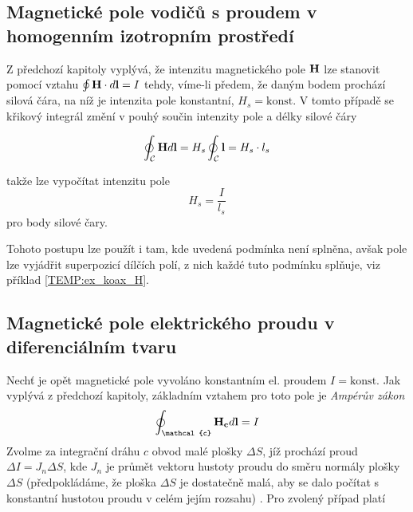     \subsection{Magnetické pole vodičů s proudem v homogen\-ním izo\-trop\-ním prostředí}
      Z předchozí kapitoly vyplývá, že intenzitu magnetického pole $\mathbf{H}$ lze stanovit pomocí
      vztahu $\oint\mathbf{H}\cdot d\mathbf{l} = I$ tehdy, víme-li předem, že daným bodem prochází silová
      čára, na níž je intenzita pole konstantní, $H_s = \text{konst}$. V tomto případě se křikový
      integrál změní v pouhý součin intenzity pole a délky silové čáry
       
       \begin{equation}\label{TEMP:eq_1MR_v_hom_p}
         \oint_\mathcal{C}\mathbf{H}d\mathbf{l} = H_s\oint_\mathcal{C}\mathbf{l} = H_s\cdot l_s
       \end{equation}      
       
      takže lze vypočítat intenzitu pole $$H_s = \frac{I}{l_s}$$ pro body silové čary. 
      
      Tohoto postupu lze použít i tam, kde uvedená podmínka není splněna, avšak pole lze vyjádřit
      superpozicí dílčích polí, z nich každé tuto podmínku splňuje, viz příklad 
      \ref{TEMP:ex_koax_H}. 

        

        

    \subsection{Magnetické pole elektrického proudu v diferenciálním tvaru}
      Nechť je opět magnetické pole vyvoláno konstantním el. proudem $I = \text{konst}$. Jak
      vyplývá z předchozí kapitoly, základním vztahem pro toto pole je \emph{Ampérův zákon}
      $$\oint_\mathcal{c}\vr{H_c}d\vr{l} = I$$  Zvolme za integrační dráhu $c$ obvod malé plošky
      $\Delta S$, jíž prochází proud $\Delta I = J_n \Delta S$, kde $J_n$ je průmět vektoru hustoty
      proudu do směru normály plošky $\Delta S$ (předpokládáme, že ploška $\Delta S$ je dostatečně
      malá, aby se dalo počítat s konstantní hustotou proudu v celém jejím rozsahu)
      \cite[s.~13]{Trnka1972}. Pro zvolený případ platí
      
